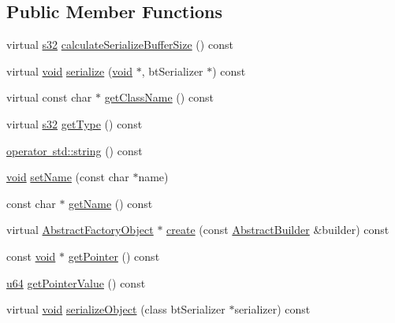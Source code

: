\subsection*{Public Member Functions}
\begin{DoxyCompactItemize}
\item 
virtual \mbox{\hyperlink{_util_8h_aa62c75d314a0d1f37f79c4b73b2292e2}{s32}} \mbox{\hyperlink{classnjli_1_1_skinner_af88dbc19397204e3f8811bb90619eb76}{calculate\+Serialize\+Buffer\+Size}} () const
\item 
virtual \mbox{\hyperlink{_thread_8h_af1e856da2e658414cb2456cb6f7ebc66}{void}} \mbox{\hyperlink{classnjli_1_1_skinner_ad70231f29258b02bd8a64701b4535856}{serialize}} (\mbox{\hyperlink{_thread_8h_af1e856da2e658414cb2456cb6f7ebc66}{void}} $\ast$, bt\+Serializer $\ast$) const
\item 
virtual const char $\ast$ \mbox{\hyperlink{classnjli_1_1_skinner_ad81abcf0cfc3dd6ca23709c9a88a6e75}{get\+Class\+Name}} () const
\item 
virtual \mbox{\hyperlink{_util_8h_aa62c75d314a0d1f37f79c4b73b2292e2}{s32}} \mbox{\hyperlink{classnjli_1_1_skinner_a797a6a7f87d2bdb108bd23789bf54a79}{get\+Type}} () const
\item 
\mbox{\hyperlink{classnjli_1_1_skinner_aa7aaf60e36df1de64cd62c6858ee13c0}{operator std\+::string}} () const
\item 
\mbox{\hyperlink{_thread_8h_af1e856da2e658414cb2456cb6f7ebc66}{void}} \mbox{\hyperlink{classnjli_1_1_skinner_a087eb5f8d9f51cc476f12f1d10a3cb95}{set\+Name}} (const char $\ast$name)
\item 
const char $\ast$ \mbox{\hyperlink{classnjli_1_1_skinner_ad41266885be835f3ee602311e20877a4}{get\+Name}} () const
\item 
virtual \mbox{\hyperlink{classnjli_1_1_abstract_factory_object}{Abstract\+Factory\+Object}} $\ast$ \mbox{\hyperlink{classnjli_1_1_skinner_a83a8876ae63b92804004cf3febe76573}{create}} (const \mbox{\hyperlink{classnjli_1_1_abstract_builder}{Abstract\+Builder}} \&builder) const
\item 
const \mbox{\hyperlink{_thread_8h_af1e856da2e658414cb2456cb6f7ebc66}{void}} $\ast$ \mbox{\hyperlink{classnjli_1_1_skinner_ac4ca71716ed832be357f15f8262c8448}{get\+Pointer}} () const
\item 
\mbox{\hyperlink{_util_8h_ad758b7a5c3f18ed79d2fcd23d9f16357}{u64}} \mbox{\hyperlink{classnjli_1_1_skinner_a4ffddf141a426a5a07d0ac19f1913811}{get\+Pointer\+Value}} () const
\item 
virtual \mbox{\hyperlink{_thread_8h_af1e856da2e658414cb2456cb6f7ebc66}{void}} \mbox{\hyperlink{classnjli_1_1_skinner_a4fc4bcd9d1930911474210c047372fc0}{serialize\+Object}} (class bt\+Serializer $\ast$serializer) const
\end{DoxyCompactItemize}
